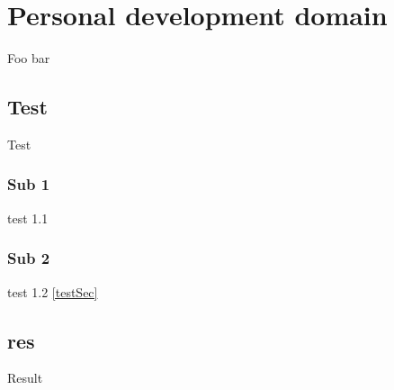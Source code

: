 
\chapter{Personal development domain}

Foo bar
\section{Test}
Test \label{testSec}
\subsection{Sub 1}
test 1.1
\subsection{Sub 2}
test 1.2
\ref{testSec}
\section{res}
Result
